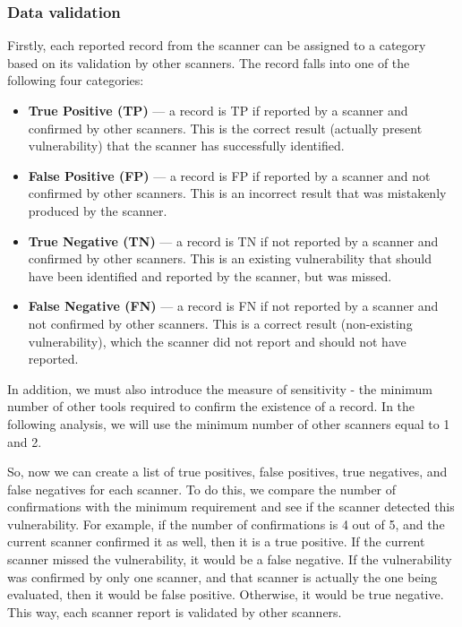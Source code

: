 \subsubsection*{Data validation}

Firstly, each reported record from the scanner can be assigned to a category based on its validation by other scanners. The record falls into one of the following four categories:

\begin{itemize}
    \item \textbf{True Positive (TP)} — a record is TP if reported by a scanner and confirmed by other scanners. This is the correct result (actually present vulnerability) that the scanner has successfully identified.
    \item \textbf{False Positive (FP)} — a record is FP if reported by a scanner and not confirmed by other scanners. This is an incorrect result that was mistakenly produced by the scanner.
    \item \textbf{True Negative (TN)} — a record is TN if not reported by a scanner and confirmed by other scanners. This is an existing vulnerability that should have been identified and reported by the scanner, but was missed.
    \item \textbf{False Negative (FN)} — a record is FN if not reported by a scanner and not confirmed by other scanners. This is a correct result (non-existing vulnerability), which the scanner did not report and should not have reported.
\end{itemize}

In addition, we must also introduce the measure of sensitivity - the minimum number of other tools required to confirm the existence of a record. In the following analysis, we will use the minimum number of other scanners equal to 1 and 2.

So, now we can create a list of true positives, false positives, true negatives, and false negatives for each scanner. To do this, we compare the number of confirmations with the minimum requirement and see if the scanner detected this vulnerability. For example, if the number of confirmations is 4 out of 5, and the current scanner confirmed it as well, then it is a true positive. If the current scanner missed the vulnerability, it would be a false negative. If the vulnerability was confirmed by only one scanner, and that scanner is actually the one being evaluated, then it would be false positive. Otherwise, it would be true negative. This way, each scanner report is validated by other scanners.

